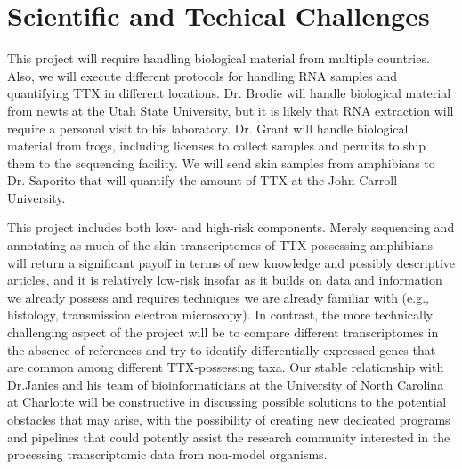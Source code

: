 \section{Scientific and Techical Challenges}


This project will require handling biological material from multiple countries. Also, we will execute different protocols for handling RNA samples and quantifying TTX in different locations. Dr. Brodie will handle biological material from newts at the Utah State University, but it is likely that RNA extraction will require a personal visit to his laboratory. Dr. Grant will handle biological material from frogs, including licenses to collect samples and permits to ship them to the sequencing facility. We will send skin samples from amphibians to Dr. Saporito that will quantify the amount of TTX at the John Carroll University.

This project includes both low- and high-risk components. Merely sequencing and annotating as much of the skin transcriptomes of TTX-possessing amphibians will return a significant payoff in terms of new knowledge and possibly descriptive articles, and it is relatively low-risk insofar as it builds on data and information we already possess and requires techniques we are already familiar with (e.g., histology, transmission electron microscopy). In contrast, the more technically challenging aspect of the project will be to compare different transcriptomes in the absence of references and try to identify differentially expressed genes that are common among different TTX-possessing taxa. Our stable relationship with Dr.Janies and his team of bioinformaticians at the University of North Carolina at Charlotte will be constructive in discussing possible solutions to the potential obstacles that may arise, with the possibility of creating new dedicated programs and pipelines that could potently assist the research community interested in the processing transcriptomic data from non-model organisms.